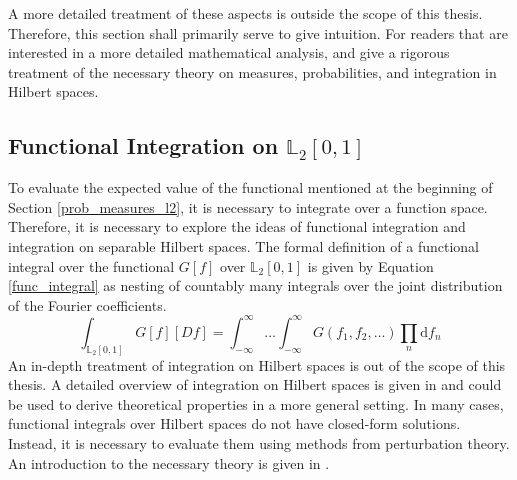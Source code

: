 \documentclass[12pt, a4paper]{article}
\theoremstyle{MAstyle} \newtheorem{assumption}{Assumption}[section]
\theoremstyle{MAstyle} \newtheorem{definition}{Definition}[section]
\theoremstyle{MAstyle} \newtheorem{theorem}{Theorem}[section]
\begin{document}
			A more detailed treatment of these aspects is outside the scope of this thesis. Therefore, this section shall primarily serve to give intuition. For readers that are interested in a more detailed mathematical analysis, \cite{gihman_theory_2004} and \cite{skorohod_integration_1974} give a rigorous treatment of the necessary theory on measures, probabilities, and integration in Hilbert spaces. 
		
		\subsection{Functional Integration on $\mathbb{L}_2[0,1]$}\label{Integration}
			To evaluate the expected value of the functional mentioned at the beginning of Section \ref{prob_measures_l2}, it is necessary to integrate over a function space. Therefore, it is necessary to explore the ideas of functional integration and integration on separable Hilbert spaces. 
			The formal definition of a functional integral over the functional $G[f]$ over $\mathbb{L}_2[0,1]$ is given by Equation \ref{func_integral} as nesting of countably many integrals over the joint distribution of the Fourier coefficients. 
			\begin{equation}\label{func_integral}
				\int_{\mathbb{L}_2[0,1]} G\left[f\right] \left[Df\right] = \int_{-\infty}^{\infty}\dots\int_{-\infty}^{\infty} G\left(f_1, f_2, \dots\right) \prod_{n} \mathrm{d}f_n
			\end{equation}
			An in-depth treatment of integration on Hilbert spaces is out of the scope of this thesis. A detailed overview of integration on Hilbert spaces is given in \cite{skorohod_integration_1974} and could be used to derive theoretical properties in a more general setting. In many cases, functional integrals over Hilbert spaces do not have closed-form solutions. Instead, it is necessary to evaluate them using methods from perturbation theory. An introduction to the necessary theory is given in \cite{jeribi_perturbation_2021}.\\
			
\end{document}
